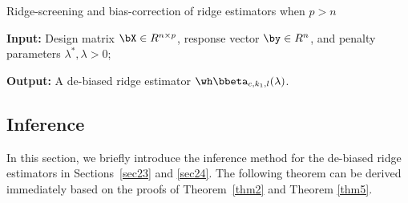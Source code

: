 \begin{algorithm}[ht]
\caption{Ridge-screening and bias-correction of ridge estimators when $p> n$}\label{plarge:a2}
{\bf Input:} Design matrix $\bX\in R^{n\times p}$, response vector $\by\in R^{n}$, and penalty parameters $\lambda^*,\lambda>0$;
\begin{algorithmic}[1]
\end{algorithmic}
{\bf Output:} A de-biased ridge estimator $\wh\bbeta_{c,k_1,l}(\lambda)$.
\end{algorithm}



  \subsection{Inference}\label{sec25}
In this section, we briefly introduce the inference method for the de-biased ridge estimators in Sections~\ref{sec23} and \ref{sec24}. The following theorem can be derived immediately based on the proofs of Theorem~\ref{thm2} and Theorem \ref{thm5}.


